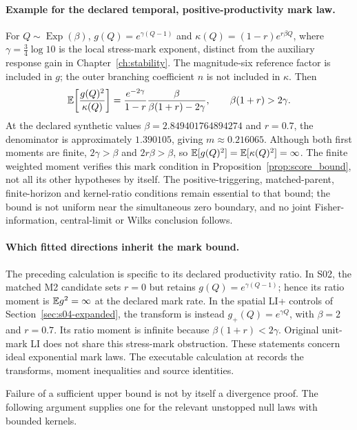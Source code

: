 \paragraph{Example for the declared temporal, positive-productivity mark law.}
For \(Q\sim\operatorname{Exp}(\beta)\),
\(g(Q)=e^{\gamma(Q-1)}\) and \(\kappa(Q)=(1-r)e^{r\beta Q}\),
where \(\gamma=\tfrac34\log 10\) is the local stress-mark exponent,
distinct from the auxiliary response gain in Chapter~\ref{ch:stability}.
The magnitude-six reference factor is included in \(g\); the outer
branching coefficient \(n\) is not included in \(\kappa\). Then
\[
  \mathbb{E}\!\left[\frac{g(Q)^2}{\kappa(Q)}\right]
  =\frac{e^{-2\gamma}}{1-r}
    \frac{\beta}{\beta(1+r)-2\gamma},
  \qquad \beta(1+r)>2\gamma.
\]
At the declared synthetic values \(\beta=2.849401764894274\) and \(r=0.7\),
the denominator is approximately \(1.390105\), giving
\(m\approx 0.216065\). Although both first moments are finite,
\(2\gamma>\beta\) and \(2r\beta>\beta\), so
\(\mathbb{E}[g(Q)^2]=\mathbb{E}[\kappa(Q)^2]=\infty\).
The finite weighted moment verifies this mark condition in Proposition~\ref{prop:score_bound},
not all its other hypotheses by itself. The positive-triggering,
matched-parent, finite-horizon and kernel-ratio conditions remain essential to that bound;
the bound is not uniform near the simultaneous zero boundary, and
no joint Fisher-information, central-limit or Wilks conclusion follows.

\paragraph{Which fitted directions inherit the mark bound.}
The preceding calculation is specific to its declared productivity ratio. In S02, the matched M2 candidate sets \(r=0\) but retains \(g(Q)=e^{\gamma(Q-1)}\); hence its ratio moment is \(\mathbb{E} g^2=\infty\) at the declared mark rate. In the spatial LI+ controls of Section~\ref{sec:s04-expanded}, the transform is instead \(g_+(Q)=e^{\gamma Q}\), with \(\beta=2\) and \(r=0.7\). Its ratio moment is infinite because \(\beta(1+r)<2\gamma\). Original unit-mark LI does not share this stress-mark obstruction. These statements concern ideal exponential mark laws. The executable calculation at  records the transforms, moment inequalities and source identities.

Failure of a sufficient upper bound is not by itself a divergence proof. The following argument supplies one for the relevant unstopped null laws with bounded kernels.

